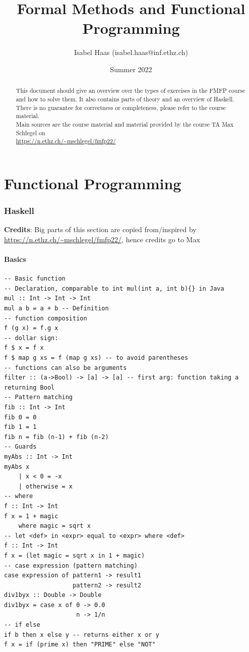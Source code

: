 \documentclass{article}
\title{Formal Methods and Functional Programming}
\author{Isabel Haas (isabel.haas@inf.ethz.ch)}
\date{Summer 2022}
\begin{document}
\maketitle

\begin{abstract}
This document should give an overview over the types of exercises in the FMFP course and how to solve them. 
It also contains parts of theory and an overview of Haskell. \\
There is no guarantee for correctness or completeness, please refer to the course material. \\
Main sources are the course material and material provided by the course TA
Max Schlegel on \\ \url{https://n.ethz.ch/~mschlegel/fmfp22/}
\end{abstract}

\thispagestyle{empty}
\tableofcontents

\newpage

\part*{Functional Programming}
\setcounter{section}{0}
\renewcommand*{\theHsection}{chX.\the\value{section}}

\section{Haskell}
\textbf{Credits}: Big parts of this section are copied from/inspired by \url{https://n.ethz.ch/~mschlegel/fmfp22/}, hence credits go to Max
\setcounter{page}{1}
\subsection{Basics}
\begin{verbatim}
-- Basic function
-- Declaration, comparable to int mul(int a, int b){} in Java
mul :: Int -> Int -> Int 
mul a b = a + b -- Definition
-- function composition
f (g x) = f.g x
-- dollar sign:
f $ x = f x
f $ map g xs = f (map g xs) -- to avoid parentheses 
-- functions can also be arguments
filter :: (a->Bool) -> [a] -> [a] -- first arg: function taking a returning Bool
-- Pattern matching
fib :: Int -> Int
fib 0 = 0
fib 1 = 1
fib n = fib (n-1) + fib (n-2)
-- Guards
myAbs :: Int -> Int 
myAbs x
    | x < 0 = -x
    | otherwise = x
-- where 
f :: Int -> Int
f x = 1 + magic 
    where magic = sqrt x
-- let <def> in <expr> equal to <expr> where <def>
f :: Int -> Int
f x = (let magic = sqrt x in 1 + magic)
-- case expression (pattern matching)
case expression of pattern1 -> result1
                   pattern2 -> result2
div1byx :: Double -> Double
div1byx = case x of 0 -> 0.0
                    n -> 1/n
-- if else
if b then x else y -- returns either x or y
f x = if (prime x) then "PRIME" else "NOT" 
\end{verbatim}
\end{document}
